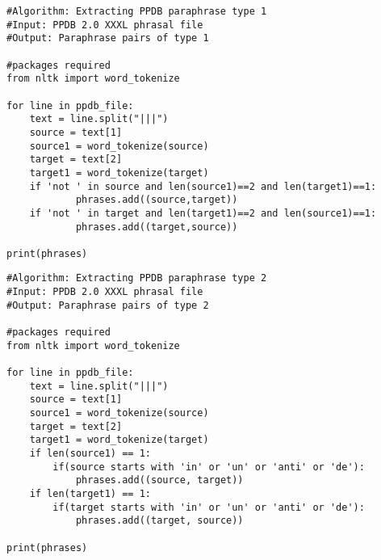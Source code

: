 \documentclass[11pt]{article}
\begin{document}
\begin{lstlisting}
#Algorithm: Extracting PPDB paraphrase type 1
#Input: PPDB 2.0 XXXL phrasal file
#Output: Paraphrase pairs of type 1

#packages required
from nltk import word_tokenize

for line in ppdb_file:
    text = line.split("|||")
    source = text[1]
    source1 = word_tokenize(source)
    target = text[2]
    target1 = word_tokenize(target)
    if 'not ' in source and len(source1)==2 and len(target1)==1:
            phrases.add((source,target))
    if 'not ' in target and len(target1)==2 and len(source1)==1:
            phrases.add((target,source))

print(phrases)
\end{lstlisting}

\begin{lstlisting}
#Algorithm: Extracting PPDB paraphrase type 2
#Input: PPDB 2.0 XXXL phrasal file
#Output: Paraphrase pairs of type 2

#packages required
from nltk import word_tokenize

for line in ppdb_file:
    text = line.split("|||")
    source = text[1]
    source1 = word_tokenize(source)
    target = text[2]
    target1 = word_tokenize(target)
    if len(source1) == 1:
        if(source starts with 'in' or 'un' or 'anti' or 'de'):
            phrases.add((source, target))
    if len(target1) == 1:
        if(target starts with 'in' or 'un' or 'anti' or 'de'):
            phrases.add((target, source))

print(phrases)
\end{lstlisting}
\end{document}
